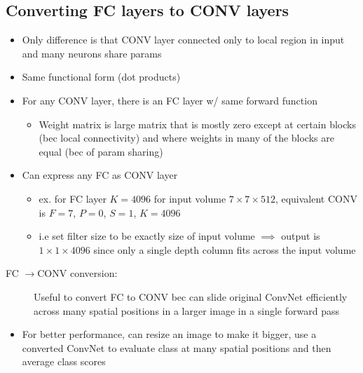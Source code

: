 \documentclass[a4paper,12pt]{article}
\newcommand{\lra}{\ensuremath{\longrightarrow{}}}
\begin{document}
\subsection{Converting FC layers to CONV layers}
\begin{itemize}
  \item Only difference is that CONV layer connected only to local region in input and many neurons share params
  \item Same functional form (dot products)
  \item For any CONV layer, there is an FC layer w/ same forward function
  \begin{itemize}
    \item Weight matrix is large matrix that is mostly zero except at certain blocks (bec local connectivity) and where weights in many of the blocks are equal (bec of param sharing)
  \end{itemize}
  \item Can express any FC as CONV layer
  \begin{itemize}
    \item ex. for FC layer $K = 4096$ for input volume $7\times 7\times 512$, equivalent CONV is $F=7$, $P=0$, $S=1$, $K=4096$
    \item i.e set filter size to be exactly size of input volume $\implies$ output is $1\times 1\times 4096$ since only a single depth column fits across the input volume
  \end{itemize}
\end{itemize}

\begin{description}
  \item[FC \lra CONV conversion:] Useful to convert FC to CONV bec can slide original ConvNet efficiently across many spatial positions in a larger image in a single forward pass
\end{description}
\begin{itemize}
  \item For better performance, can resize an image to make it bigger, use a converted ConvNet to evaluate class at many spatial positions and then average class scores
\end{itemize}
\end{document}
